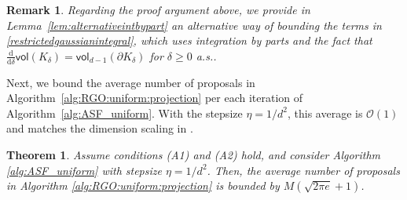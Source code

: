 \documentclass[11pt,letterpaper]{article}
\newcommand{\D}{\mathrm{d}}
\newcommand{\vol}{\mathsf{vol}}
\newtheorem{theorem}[thm]{Theorem}
\newtheorem{remark}[thm]{Remark}
\begin{document}
\begin{remark}
\label{rem:alternative}
    Regarding the proof argument above, we provide in Lemma~\ref{lem:alternativeintbypart} an alternative way of bounding the terms in \eqref{restrictedgaussianintegral}, which uses integration by parts and the fact that $\frac{\D}{\D\delta} \vol(K_\delta)=\vol_{d-1}(\partial K_\delta)$ for $\delta\geq 0$ a.s.. 
\end{remark}



Next, we bound the average number of proposals in Algorithm~\ref{alg:RGO:uniform:projection} per each iteration of Algorithm~\ref{alg:ASF_uniform}. With the stepsize $\eta=1/d^2$, this average is $\mathcal{O}(1)$ and matches the dimension scaling in \cite[Theorem~27]{kook2024inandout}.


\begin{theorem}
\label{theo:averagerejection_projection} Assume conditions (A1) and (A2) hold, and consider Algorithm \ref{alg:ASF_uniform} with stepsize $\eta =1/d^2$.  Then, the average number of proposals in Algorithm \ref{alg:RGO:uniform:projection} is bounded by $M(\sqrt{2\pi e}+1)$.
\end{theorem}
\end{document}
